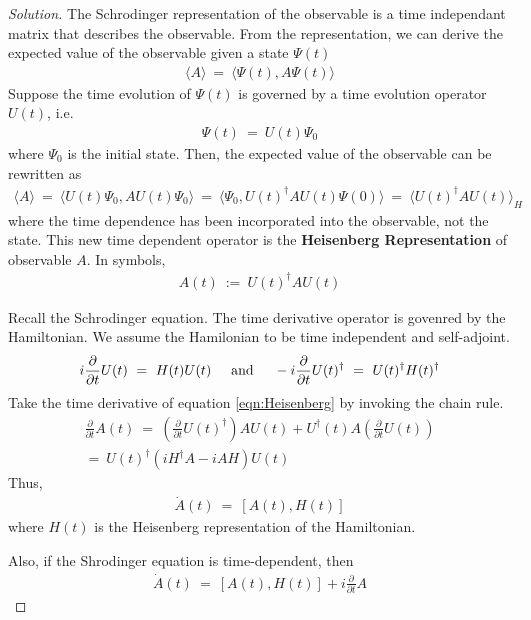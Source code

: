 \documentclass{article}
\numberwithin{equation}{section}
\newcommand{\textAnd}{
    {
        \hspace{5mm}
        \textrm{and}
        \hspace{5mm}
    }
}
\newcommand{\ExpVal}[1]{
    {
        \langle{#1}\rangle
    }
}
\newcommand{\InProd}[2]{
    {
        \langle{#1, #2}\rangle
    }
}
\newcommand{\pderiv}[1]{
    {
        \frac {\partial}{\partial{#1}}
    }
}
\begin{document}
\begin{proof}[Solution]
    The Schrodinger representation of the observable is a time independant 
    matrix that describes the observable. From the representation, we can 
    derive the expected value of the observable given a state $\Psi(t)$
    \begin{align}
        \ExpVal{A} \ = \ \InProd{\Psi(t)}{A \Psi(t)}
    \end{align}
    Suppose the time evolution of $\Psi(t)$ is governed by a time 
    evolution operator $U(t)$, i.e. 
    \begin{align}
        \Psi(t) \ = \ U(t) \Psi_0
    \end{align}
    where $\Psi_0$ is the initial state. Then, the expected value 
    of the observable can be rewritten as 
    \begin{align}\label{eqn:Heisenberg}
        \ExpVal{A} \ = \ \InProd{U(t)\Psi_0}{A U(t)\Psi_0} \ = \  
        \InProd{\Psi_0}{U(t)^\dag A U(t) \Psi(0)}
        \ = \  
        \ExpVal{U(t)^\dag A U(t)}_{H} 
    \end{align}
    where the time dependence has been incorporated into the observable, 
    not the state. This new time dependent operator is the 
    \textbf{Heisenberg Representation} of observable $A$. In symbols, 
    \begin{align}
        A(t) \ := \ U(t)^\dag A U(t)
    \end{align}

    Recall the Schrodinger equation. The time derivative operator 
    is govenred by the Hamiltonian. We assume the Hamilonian to be 
    time independent and self-adjoint. 
    \begin{align}
        i \pderiv{t} U(t) \ = \ H(t) U(t) 
        \textAnd
        -i \pderiv{t} U(t)^\dag \ = \ U(t)^\dag H(t)^\dag 
    \end{align}
    Take the time derivative of equation \eqref{eqn:Heisenberg} by 
    invoking the chain rule. 
    \begin{align}
        \pderiv{t} A(t) \ = \  
        \left(
            \pderiv t U(t)^\dag 
        \right) A U(t) + 
        U^\dag(t) A
        \left(
            \pderiv t U(t)
        \right) \nonumber \\ 
        = \ U(t)^\dag \left(iH^\dag A - iA H\right) U(t)
    \end{align}
    Thus, 
    \begin{align}
        \dot A(t) \ = \ [A(t), H(t)]
    \end{align}
    where $H(t)$ is the Heisenberg representation of the Hamiltonian. 

    Also, if the Shrodinger equation is time-dependent, then 
\begin{align}
        \dot A(t) \ = \ [A(t), H(t)] + i \pderiv t A
    \end{align}
\end{proof}
\end{document}
